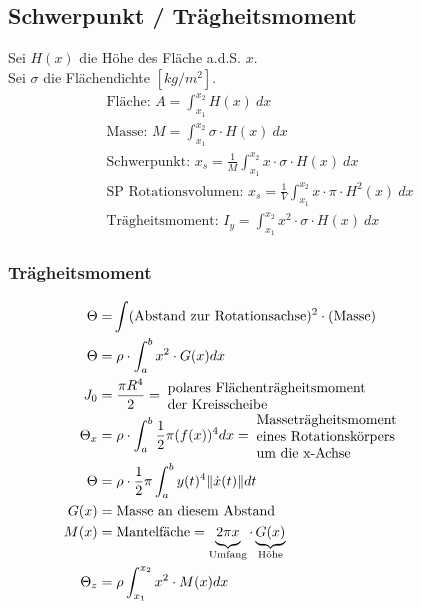 \subsection{Schwerpunkt / Trägheitsmoment}
    Sei $H(x)$ die Höhe des Fläche a.d.S. $x$.\\
    Sei $\sigma$ die Flächendichte $[kg/m^2]$.
    \begin{align*}
        \textrm{Fläche: }  A = \int_{x_1}^{x_2} H(x)\ dx\\
        \textrm{Masse: }  M = \int_{x_1}^{x_2} \sigma \cdot H(x)\ dx\\
        \textrm{Schwerpunkt: }  x_s = \frac{1}{M} \int_{x_1}^{x_2} x \cdot \sigma \cdot H(x)\ dx\\
        \textrm{SP Rotationsvolumen: } x_s = \frac{1}{V} \int_{x_1}^{x_2} x \cdot \pi \cdot H^2(x)\ dx\\
        \textrm{Trägheitsmoment: }  I_y = \int_{x_1}^{x_2} x^2 \cdot \sigma \cdot H(x)\ dx
    \end{align*}
    \subsubsection{Trägheitsmoment}
    \vspace*{-1em}
        \begin{align*}
            \Theta =& \int (\textrm{Abstand zur Rotationsachse})^2 \cdot (\textrm{Masse})\\
            \Theta =& \; \rho \cdot \int_a^b x^2 \cdot G(x) dx\\
            J_0 =& \; \frac{\pi R^4}{2} = \; \parbox{5cm}{polares Flächenträgheitsmoment\\ der Kreisscheibe}\\
            \Theta_x =& \; \rho \cdot \int_a^b \frac{1}{2} \pi (f(x))^4 dx = \; \parbox{5cm}{Masseträgheitsmoment\\ eines Rotationskörpers\\ um die x-Achse}\\
            \Theta =& \; \rho \cdot \frac{1}{2} \pi \int_a^{b} y(t)^4\|\dot{x}(t)\| dt\\
            G(x) =& \; \text{Masse an diesem Abstand}\\
            M(x) =& \; \text{Mantelfäche} = \underbrace{2 \pi x \vphantom{G(x)}}_{\text{Umfang}} \cdot \underbrace{G(x)}_{\text{Höhe}}\\
            \Theta_z =& \; \rho \int_{x_1}^{x_2} x^2 \cdot M(x) dx
        \end{align*}        